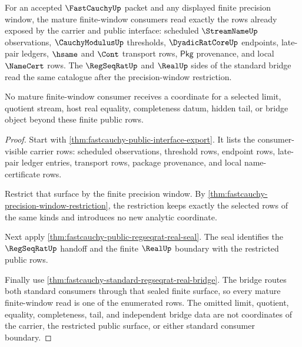 \begin{theorem}
\label{thm:fastcauchy-mature-finite-window-consumer-catalogue}
For an accepted $\FastCauchyUp$ packet and any displayed finite precision
window, the mature finite-window consumers read exactly the rows already exposed
by the carrier and public interface: scheduled $\StreamNameUp$ observations,
$\CauchyModulusUp$ thresholds, $\DyadicRatCoreUp$ endpoints, late-pair ledgers,
$\hsame$ and $\Cont$ transport rows, $\mathsf{Pkg}$ provenance, and local
$\NameCert$ rows. The $\RegSeqRatUp$ and $\RealUp$ sides of the standard bridge
read the same catalogue after the precision-window restriction.

No mature finite-window consumer receives a coordinate for a selected limit,
quotient stream, host real equality, completeness datum, hidden tail, or bridge
object beyond these finite public rows.
\end{theorem}
\begin{proof}
Start with \autoref{thm:fastcauchy-public-interface-export}. It lists the
consumer-visible carrier rows: scheduled observations, threshold rows, endpoint
rows, late-pair ledger entries, transport rows, package provenance, and local
name-certificate rows.

Restrict that surface by the finite precision window. By
\autoref{thm:fastcauchy-precision-window-restriction}, the restriction keeps
exactly the selected rows of the same kinds and introduces no new analytic
coordinate.

Next apply \autoref{thm:fastcauchy-public-regseqrat-real-seal}. The seal
identifies the $\RegSeqRatUp$ handoff and the finite $\RealUp$ boundary with the
restricted public rows.

Finally use \autoref{thm:fastcauchy-standard-regseqrat-real-bridge}. The bridge
routes both standard consumers through that sealed finite surface, so every
mature finite-window read is one of the enumerated rows. The omitted limit,
quotient, equality, completeness, tail, and independent bridge data are not
coordinates of the carrier, the restricted public surface, or either standard
consumer boundary.
\end{proof}

